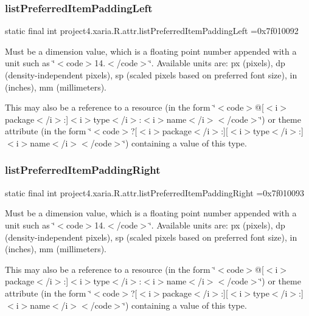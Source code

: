\subsubsection{\texorpdfstring{list\+Preferred\+Item\+Padding\+Left}{listPreferredItemPaddingLeft}}
{\footnotesize\ttfamily static final int project4.\+xaria.\+R.\+attr.\+list\+Preferred\+Item\+Padding\+Left =0x7f010092\hspace{0.3cm}{\ttfamily [static]}}

Must be a dimension value, which is a floating point number appended with a unit such as \char`\"{}$<$code$>$14.\+5sp$<$/code$>$\char`\"{}. Available units are\+: px (pixels), dp (density-\/independent pixels), sp (scaled pixels based on preferred font size), in (inches), mm (millimeters). 

This may also be a reference to a resource (in the form \char`\"{}$<$code$>$@\mbox{[}$<$i$>$package$<$/i$>$\+:\mbox{]}$<$i$>$type$<$/i$>$\+:$<$i$>$name$<$/i$>$$<$/code$>$\char`\"{}) or theme attribute (in the form \char`\"{}$<$code$>$?\mbox{[}$<$i$>$package$<$/i$>$\+:\mbox{]}\mbox{[}$<$i$>$type$<$/i$>$\+:\mbox{]}$<$i$>$name$<$/i$>$$<$/code$>$\char`\"{}) containing a value of this type. \mbox{\label{classproject4_1_1xaria_1_1R_1_1attr_a0ac3520ccc66f398826814f8ccff1b03}} 
\subsubsection{\texorpdfstring{list\+Preferred\+Item\+Padding\+Right}{listPreferredItemPaddingRight}}
{\footnotesize\ttfamily static final int project4.\+xaria.\+R.\+attr.\+list\+Preferred\+Item\+Padding\+Right =0x7f010093\hspace{0.3cm}{\ttfamily [static]}}

Must be a dimension value, which is a floating point number appended with a unit such as \char`\"{}$<$code$>$14.\+5sp$<$/code$>$\char`\"{}. Available units are\+: px (pixels), dp (density-\/independent pixels), sp (scaled pixels based on preferred font size), in (inches), mm (millimeters). 

This may also be a reference to a resource (in the form \char`\"{}$<$code$>$@\mbox{[}$<$i$>$package$<$/i$>$\+:\mbox{]}$<$i$>$type$<$/i$>$\+:$<$i$>$name$<$/i$>$$<$/code$>$\char`\"{}) or theme attribute (in the form \char`\"{}$<$code$>$?\mbox{[}$<$i$>$package$<$/i$>$\+:\mbox{]}\mbox{[}$<$i$>$type$<$/i$>$\+:\mbox{]}$<$i$>$name$<$/i$>$$<$/code$>$\char`\"{}) containing a value of this type. \mbox{\label{classproject4_1_1xaria_1_1R_1_1attr_a3320dd5ff1fd6f9ac717bba5848ca42f}} 
